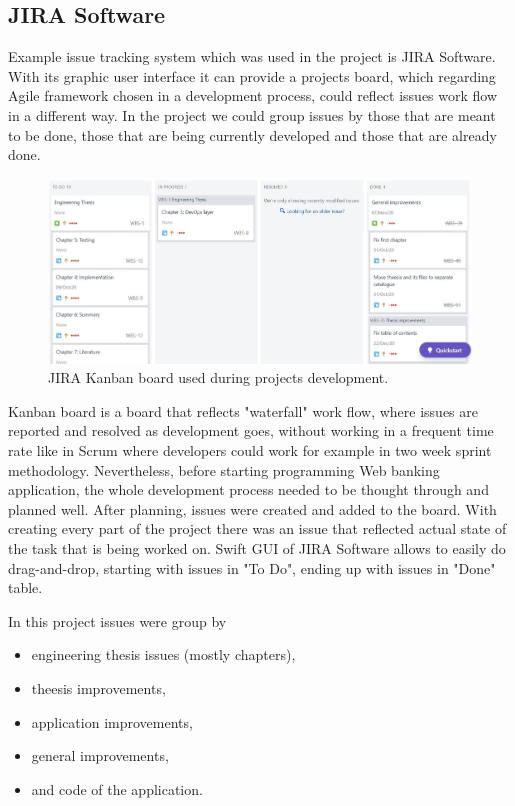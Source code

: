 \documentclass[a4paper,12pt]{book}
\newcommand\tab[1][1cm]{\hspace*{#1}}
\begin{document}
\subsection{JIRA Software}
{
\tab Example issue tracking system which was used in the project is JIRA Software. With its graphic user interface it can provide a projects board, which regarding Agile framework chosen in a development process, could reflect issues work flow in a different way. In the project we could group issues by those that are meant to be done, those that are being currently developed and those that are already done.

\bigskip
\begin{figure}[H]
  \centering
    \includegraphics[width=1.0\textwidth]{kanban}
    \caption{JIRA Kanban board used during projects development.~\cite{jiraboard}}
\end{figure} 
    
\bigskip Kanban board is a board that reflects "waterfall" work flow, where issues are reported and resolved as development goes, without working in a frequent time rate like in Scrum where developers could work for example in two week sprint methodology. Nevertheless, before starting programming Web banking application, the whole development process needed to be thought through and planned well. After planning, issues were created and added to the board. With creating every part of the project there was an issue that reflected actual state of the task that is being worked on. Swift GUI of JIRA Software allows to easily do drag-and-drop, starting with issues in "To Do", ending up with issues in "Done" table.
    
\bigskip
In this project issues were group by
\begin{itemize}
	\item engineering thesis issues (mostly chapters),
	\item theesis improvements,
	\item application improvements,
	\item general improvements,
	\item and code of the application.
\end{itemize}
	
}
\end{document}
